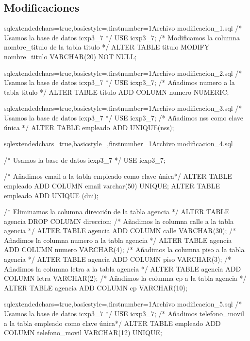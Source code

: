 	\subsection{Modificaciones}
		\begin{sourcecodep}[]{sql}{extendedchars=true,basicstyle={\fontsize{10}{10}\selectfont\ttfamily},firstnumber=1}{Archivo modificacion\_1.sql}
			/* Usamos la base de datos icxp3_7 */
			USE icxp3_7;
			/* Modificamos la columna nombre_titulo de la tabla titulo */
			ALTER TABLE titulo MODIFY nombre_titulo VARCHAR(20) NOT NULL;\end{sourcecodep}
		\begin{sourcecodep}[]{sql}{extendedchars=true,basicstyle={\fontsize{10}{10}\selectfont\ttfamily},firstnumber=1}{Archivo modificacion\_2.sql}
			/* Usamos la base de datos icxp3_7 */
			USE icxp3_7;
			/* Añadimos numero a la tabla titulo */
			ALTER TABLE titulo ADD COLUMN numero NUMERIC;\end{sourcecodep}
		\begin{sourcecodep}[]{sql}{extendedchars=true,basicstyle={\fontsize{10}{10}\selectfont\ttfamily},firstnumber=1}{Archivo modificacion\_3.sql}
			/* Usamos la base de datos icxp3_7 */
			USE icxp3_7;
			/* Añadimos nss como clave única */
			ALTER TABLE empleado ADD UNIQUE(nss);\end{sourcecodep}
		\begin{sourcecodep}[]{sql}{extendedchars=true,basicstyle={\fontsize{10}{10}\selectfont\ttfamily},firstnumber=1}{Archivo modificacion\_4.sql}
			
			/* Usamos la base de datos icxp3_7 */
			USE icxp3_7;
			
			/* Añadimos email a la tabla empleado como clave única*/
			ALTER TABLE empleado ADD COLUMN email varchar(50) UNIQUE;
			ALTER TABLE empleado ADD UNIQUE (dni);
			
			/* Eliminamos la columna dirección de la tabla agencia */
			ALTER TABLE agencia DROP COLUMN direccion;
			/* Añadimos la columna calle a la tabla agencia */
			ALTER TABLE agencia ADD COLUMN calle VARCHAR(30);
			/* Añadimos la columna numero a la tabla agencia */
			ALTER TABLE agencia ADD COLUMN numero VARCHAR(4);
			/* Añadimos la columna piso a la tabla agencia */
			ALTER TABLE agencia ADD COLUMN piso VARCHAR(3);
			/* Añadimos la columna letra a la tabla agencia */
			ALTER TABLE agencia ADD COLUMN letra VARCHAR(2);
			/* Añadimos la columna cp a la tabla agencia */
			ALTER TABLE agencia ADD COLUMN cp VARCHAR(10);\end{sourcecodep}
\newpage
		\begin{sourcecodep}[]{sql}{extendedchars=true,basicstyle={\fontsize{10}{10}\selectfont\ttfamily},firstnumber=1}{Archivo modificacion\_5.sql}
			/* Usamos la base de datos icxp3_7 */
			USE icxp3_7;
			/* Añadimos telefono_movil a la tabla empleado como clave única*/
			ALTER TABLE empleado ADD COLUMN telefono_movil VARCHAR(12) UNIQUE;\end{sourcecodep}
